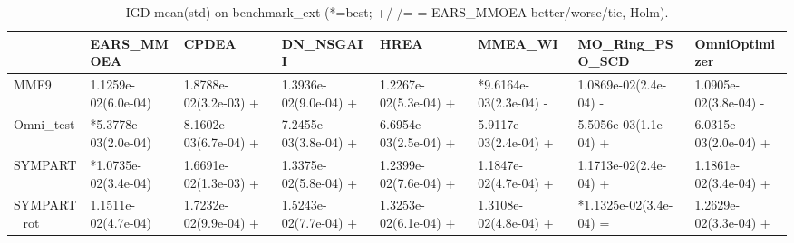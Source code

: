 \begin{table}[t]
\centering
\caption{IGD mean(std) on benchmark_ext (*=best; +/-/= = EARS_MMOEA better/worse/tie, Holm).}
\label{tab:benchmark_ext_IGD}
\begin{tabular}{llllllll}
\toprule
 & EARS\_MMOEA & CPDEA & DN\_NSGAII & HREA & MMEA\_WI & MO\_Ring\_PSO\_SCD & OmniOptimizer \\
\midrule
MMF9 & 1.1259e-02(6.0e-04) & 1.8788e-02(3.2e-03) + & 1.3936e-02(9.0e-04) + & 1.2267e-02(5.3e-04) + & *9.6164e-03(2.3e-04) - & 1.0869e-02(2.4e-04) - & 1.0905e-02(3.8e-04) - \\
Omni\_test & *5.3778e-03(2.0e-04) & 8.1602e-03(6.7e-04) + & 7.2455e-03(3.8e-04) + & 6.6954e-03(2.5e-04) + & 5.9117e-03(2.4e-04) + & 5.5056e-03(1.1e-04) + & 6.0315e-03(2.0e-04) + \\
SYMPART & *1.0735e-02(3.4e-04) & 1.6691e-02(1.3e-03) + & 1.3375e-02(5.8e-04) + & 1.2399e-02(7.6e-04) + & 1.1847e-02(4.7e-04) + & 1.1713e-02(2.4e-04) + & 1.1861e-02(3.4e-04) + \\
SYMPART\_rot & 1.1511e-02(4.7e-04) & 1.7232e-02(9.9e-04) + & 1.5243e-02(7.7e-04) + & 1.3253e-02(6.1e-04) + & 1.3108e-02(4.8e-04) + & *1.1325e-02(3.4e-04) = & 1.2629e-02(3.3e-04) + \\
\bottomrule
\end{tabular}
\end{table}
